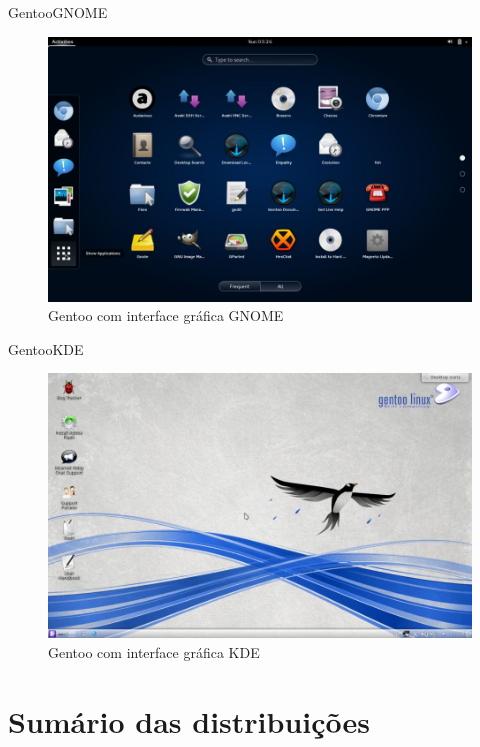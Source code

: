 \documentclass{beamer}
\begin{document}
\begin{frame}{Gentoo}{GNOME}
 \begin{figure}[h!]
        \centering
        \includegraphics[scale=0.27]{gentooGNOME.jpg}
        \caption{Gentoo com interface gráfica GNOME}
        \label{fig:Comando ls}
    \end{figure}
\end{frame}

\begin{frame}{Gentoo}{KDE}
 \begin{figure}[h!]
        \centering
        \includegraphics[scale=0.27]{gentooKDE.jpg}
        \caption{Gentoo com interface gráfica KDE}
        \label{fig:Comando ls}
    \end{figure}
\end{frame}

\section*{Sumário das distribuições}
\end{document}
